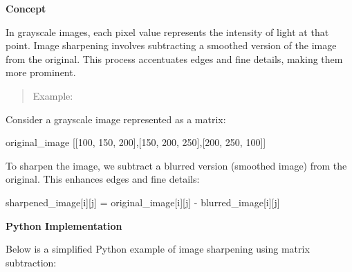 \documentclass[
  letterpaper,
  DIV=11,
  numbers=noendperiod]{scrreprt}
\newenvironment{Shaded}{\begin{snugshade}}{\end{snugshade}}
\newcommand{\DecValTok}[1]{\textcolor[rgb]{0.68,0.00,0.00}{#1}}
\newcommand{\NormalTok}[1]{\textcolor[rgb]{0.00,0.23,0.31}{#1}}
\newcommand{\OperatorTok}[1]{\textcolor[rgb]{0.37,0.37,0.37}{#1}}
\theoremstyle{plain}
\theoremstyle{definition}
\theoremstyle{remark}
\begin{document}
\textbf{Concept}

In grayscale images, each pixel value represents the intensity of light
at that point. Image sharpening involves subtracting a smoothed version
of the image from the original. This process accentuates edges and fine
details, making them more prominent.

\begin{quote}
Example:
\end{quote}

Consider a grayscale image represented as a matrix:

\begin{Shaded}
\begin{Highlighting}[]
\NormalTok{original\_image [[}\DecValTok{100}\NormalTok{, }\DecValTok{150}\NormalTok{, }\DecValTok{200}\NormalTok{],[}\DecValTok{150}\NormalTok{, }\DecValTok{200}\NormalTok{, }\DecValTok{250}\NormalTok{],[}\DecValTok{200}\NormalTok{, }\DecValTok{250}\NormalTok{, }\DecValTok{100}\NormalTok{]]}
\end{Highlighting}
\end{Shaded}

To sharpen the image, we subtract a blurred version (smoothed image)
from the original. This enhances edges and fine details:

\begin{Shaded}
\begin{Highlighting}[]
\NormalTok{sharpened\_image[i][j] }\OperatorTok{=}\NormalTok{ original\_image[i][j] }\OperatorTok{{-}}\NormalTok{ blurred\_image[i][j]}
\end{Highlighting}
\end{Shaded}

\textbf{Python Implementation}

Below is a simplified Python example of image sharpening using matrix
subtraction:
\end{document}
